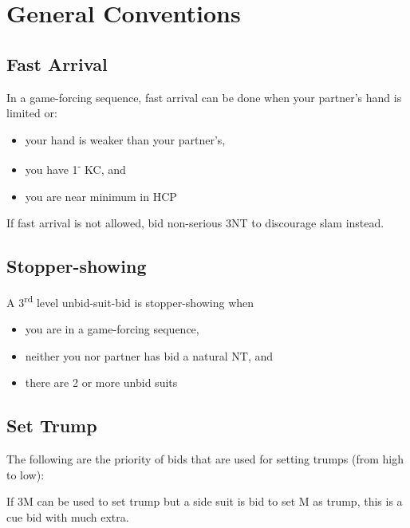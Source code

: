 \documentclass{article}
\renewcommand{\sp}{\ensuremath\spadesuit}
\newcommand{\he}{\ensuremath\heartsuit}
\newcommand{\di}{\ensuremath\diamondsuit}
\newcommand{\cl}{\ensuremath\clubsuit}
\newcommand{\nt}{\relsize{-1}NT\relsize{1}}
\newcommand{\down}{\textsuperscript{-}}
\begin{document}

\section{General Conventions}

\subsection{Fast Arrival}
In a game-forcing sequence, fast arrival can be done when your partner's hand is limited or:
\begin{itemize}
	\itemsep0em
	\item your hand is weaker than your partner's,
	\item you have 1\down{} KC, and
	\item you are near minimum in HCP
\end{itemize}
If fast arrival is not allowed, bid non-serious 3\nt{} to discourage slam instead.

\subsection{Stopper-showing}
A 3\textsuperscript{rd} level unbid-suit-bid is stopper-showing when
\begin{itemize}
	\itemsep0em
	\item you are in a game-forcing sequence,
	\item neither you nor partner has bid a natural \nt{}, and
	\item there are 2 or more unbid suits
\end{itemize}

\subsection{Set Trump}
The following are the priority of bids that are used for setting trumps (from high to low):
If 3M can be used to set trump but a side suit is bid to set M as trump, this is a cue bid with much extra.
\end{document}
